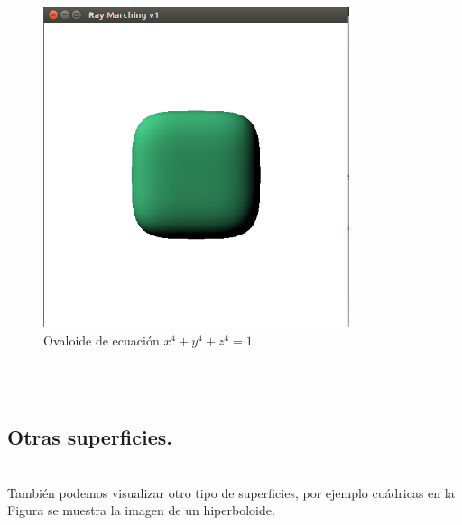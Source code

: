 \begin{figure}[h]
	\begin{center}
		\includegraphics[width=0.8\textwidth]{imagenes/Ovaloid.png}
	\end{center}
	\caption{Ovaloide de ecuación $x^4 + y^4 + z^4 = 1$.}
	\label{fig:etiq_12}
\end{figure}
${ }$\\


${ }$\\
\subsection{Otras superficies.}
${ }$\\

También podemos visualizar otro tipo de superficies, por ejemplo cuádricas en la Figura se muestra la imagen de un hiperboloide.
${ }$\\

